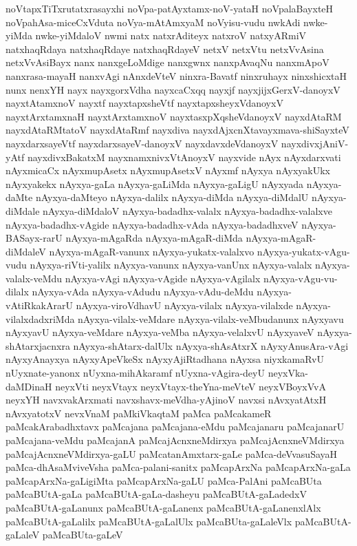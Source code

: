 {noVtapxTiTxrutatxrasayxhi
noVpa-patAyxtamx-noV-yataH
noVpalaBayxteH
noVpahAsa-miceCxVduta
noVya-mAtAmxyaM
noVyisu-vudu
nwkAdi
nwke-yiMda
nwke-yiMdaloV
nwmi
natx
natxrAditeyx
natxroV
natxyARmiV
natxhaqRdaya
natxhaqRdaye
natxhaqRdayeV
netxV
netxVtu
netxVvAsina
netxVvAsiBayx
nanx
nanxgeLoMdige
nanxgwnx
nanxpAvaqNu
nanxmApoV
nanxrasa-mayaH
nanxvAgi
nAnxdeVteV
ninxra-Bavatf
ninxruhayx
ninxshicxtaH
nunx
nenxYH
nayx
nayxgorxVdha
nayxcaCxqq
nayxjf
nayxjijxGerxV-danoyxV
nayxtAtamxnoV
nayxtf
nayxtapxsheVtf
nayxtapxsheyxVdanoyxV
nayxtArxtamxnaH
nayxtArxtamxnoV
nayxtasxpXqsheVdanoyxV
nayxdAtaRM
nayxdAtaRMtatoV
nayxdAtaRmf
nayxdiva
nayxdAjxcnXtavayxmava-shiSayxteV
nayxdarxsayeVtf
nayxdarxsayeV-danoyxV
nayxdavxdeVdanoyxV
nayxdivxjAniV-yAtf
nayxdivxBakatxM
nayxnamxnivxVtAnoyxV
nayxvide
nAyx
nAyxdarxvati
nAyxmicaCx
nAyxmupAsetx
nAyxmupAsetxV
nAyxmf
nAyxya
nAyxyakUkx
nAyxyakekx
nAyxya-gaLa
nAyxya-gaLiMda
nAyxya-gaLigU
nAyxyada
nAyxya-daMte
nAyxya-daMteyo
nAyxya-dalilx
nAyxya-diMda
nAyxya-diMdalU
nAyxya-diMdale
nAyxya-diMdaloV
nAyxya-badadhx-valalx
nAyxya-badadhx-valalxve
nAyxya-badadhx-vAgide
nAyxya-badadhx-vAda
nAyxya-badadhxveV
nAyxya-BASayx-rarU
nAyxya-mAgaRda
nAyxya-mAgaR-diMda
nAyxya-mAgaR-diMdaleV
nAyxya-mAgaR-vanunx
nAyxya-yukatx-valalxvo
nAyxya-yukatx-vAgu-vudu
nAyxya-riVti-yalilx
nAyxya-vanunx
nAyxya-vanUnx
nAyxya-valalx
nAyxya-valalx-veMdu
nAyxya-vAgi
nAyxya-vAgide
nAyxya-vAgilalx
nAyxya-vAgu-vu-dilalx
nAyxya-vAda
nAyxya-vAdudu
nAyxya-vAdu-deMdu
nAyxya-vAtiRkakArarU
nAyxya-viroVdhavU
nAyxya-vilalx
nAyxya-vilalxde
nAyxya-vilalxdadxriMda
nAyxya-vilalx-veMdare
nAyxya-vilalx-veMbudanunx
nAyxyavu
nAyxyavU
nAyxya-veMdare
nAyxya-veMba
nAyxya-velalxvU
nAyxyaveV
nAyxya-shAtarxjacnxra
nAyxya-shAtarx-dalUlx
nAyxya-shAsAtxrX
nAyxyAnusAra-vAgi
nAyxyAnayxya
nAyxyApeVkeSx
nAyxyAjiRtadhana
nAyxsa
niyxkamaRvU
nUyxnate-yanonx
nUyxna-mihAkaramf
nUyxna-vAgira-deyU
neyxVka-daMDinaH
neyxVti
neyxVtayx
neyxVtayx-theYna-meVteV
neyxVBoyxVvA
neyxYH
navxvakArxmati
navxshavx-meVdha-yAjinoV
navxsi
nAvxyatAtxH
nAvxyatotxV
nevxVnaM
paMkiVkaqtaM
paMca
paMcakameR
paMcakArabadhxtavx
paMcajana
paMcajana-eMdu
paMcajanaru
paMcajanarU
paMcajana-veMdu
paMcajanA
paMcajAcnxneMdirxya
paMcajAcnxneVMdirxya
paMcajAcnxneVMdirxya-gaLU
paMcatanAmxtarx-gaLe
paMca-deVvasuSayaH
paMca-dhAsaMviveVsha
paMca-palani-sanitx
paMcapArxNa
paMcapArxNa-gaLa
paMcapArxNa-gaLigiMta
paMcapArxNa-gaLU
paMca-PalAni
paMcaBUta
paMcaBUtA-gaLa
paMcaBUtA-gaLa-dasheyu
paMcaBUtA-gaLadedxV
paMcaBUtA-gaLanunx
paMcaBUtA-gaLanenx
paMcaBUtA-gaLanenxlAlx
paMcaBUtA-gaLalilx
paMcaBUtA-gaLalUlx
paMcaBUta-gaLaleVlx
paMcaBUtA-gaLaleV
paMcaBUta-gaLeV
}
